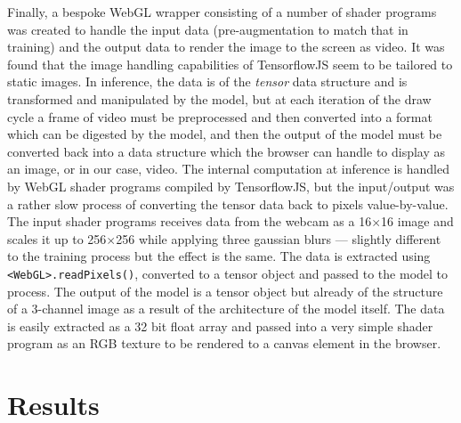 \documentclass{article}
\begin{document}
Finally, a bespoke WebGL wrapper consisting of a number of shader programs was created to handle the input data (pre-augmentation to match that in training) and the output data to render the image to the screen as video. It was found that the image handling capabilities of TensorflowJS seem to be tailored to static images. In inference, the data is of the \textit{tensor} data structure and is transformed and manipulated by the model, but at each iteration of the draw cycle a frame of video must be preprocessed and then converted into a format which can be digested by the model, and then the output of the model must be converted back into a data structure which the browser can handle to display as an image, or in our case, video. The internal computation at inference is handled by WebGL shader programs compiled by TensorflowJS, but the input/output was a rather slow process of converting the tensor data back to pixels value-by-value. The input shader programs receives data from the webcam as a 16$\times$16 image and scales it up to 256$\times$256 while applying three gaussian blurs --- slightly different to the training process but the effect is the same. The data is extracted using \verb|<WebGL>.readPixels()|, converted to a tensor object and passed to the model to process. The output of the model is a tensor object but already of the structure of a 3-channel image as a result of the architecture of the model itself. The data is easily extracted as a 32 bit float array and passed into a very simple shader program as an RGB texture to be rendered to a canvas element in the browser.

\section{Results}
\label{section:results}
\end{document}
